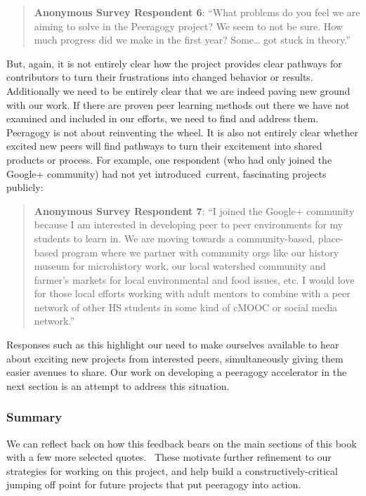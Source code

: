 \begin{quote}
\textbf{Anonymous Survey Respondent 6}: ``What problems do you feel we
are aiming to solve in the Peeragogy project? We seem to not be sure.
How much progress did we make in the first year? Some\ldots{} got stuck
in theory.''
\end{quote}

But, again, it is not entirely clear how the project provides clear
pathways for contributors to turn their frustrations into changed
behavior or results. Additionally we need to be entirely clear that we
are indeed paving new ground with our work. If there are proven peer
learning methods out there we have not examined and included in our
efforts, we need to find and address them. Peeragogy is not about
reinventing the wheel. It is also not entirely clear whether excited new
peers will find pathways to turn their excitement into shared products
or process. For example, one respondent (who had only joined the Google+
community) had not yet introduced~current, fascinating projects
publicly:

\begin{quote}
\textbf{Anonymous Survey Respondent 7}: ``I joined the Google+ community
because I am interested in developing peer to peer environments for my
students to learn in. We are moving towards a community-based,
place-based program where we partner with community orgs like our
history museum for microhistory work, our local watershed community and
farmer's markets for local environmental and food issues, etc. I would
love for those local efforts working with adult mentors to combine with
a peer network of other HS students in some kind of cMOOC or social
media network.''
\end{quote}

Responses such as this highlight our need to make ourselves available to
hear about exciting new projects from interested peers, simultaneously
giving them easier avenues to share. Our work on developing a peeragogy
accelerator in the next section is an attempt to address this situation.

\subsubsection{Summary}

\noindent We can reflect back on how this feedback bears on the main sections of
this book with a few more selected quotes.~ These motivate further
refinement to our strategies for working on this project, and help build
a constructively-critical jumping off point for future projects that put
peeragogy into action. \\


